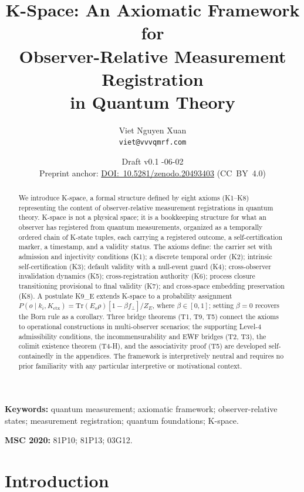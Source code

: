 \documentclass[12pt,a4paper]{article}
\title{\textbf{K-Space: An Axiomatic Framework for\\
Observer-Relative Measurement Registration\\
in Quantum Theory}}
\author{Viet Nguyen Xuan\\[6pt]
\small\texttt{viet@vvvqmrf.com}}
\date{Draft v0.1 \quad 2026-06-02\\[4pt]
\small Preprint anchor:
\href{https://doi.org/10.5281/zenodo.20493403}{DOI:~10.5281/zenodo.20493403}
\quad (CC~BY~4.0)}
\theoremstyle{plain}
\theoremstyle{definition}
\theoremstyle{remark}
\newcommand{\Kctx}{K_{\mathrm{ctx}}}
\newcommand{\fperp}{f_{\!\perp}}
\begin{document}
\maketitle
\thispagestyle{empty}

\begin{abstract}
We introduce K-space, a formal structure defined by eight axioms (K1--K8)
representing the content of observer-relative measurement registrations in
quantum theory. K-space is not a physical space; it is a bookkeeping
structure for what an observer has registered from quantum measurements,
organized as a temporally ordered chain of K-state tuples, each carrying a
registered outcome, a self-certification marker, a timestamp, and a validity
status. The axioms define: the carrier set with admission and injectivity
conditions (K1); a discrete temporal order (K2); intrinsic self-certification
(K3); default validity with a null-event guard (K4); cross-observer
invalidation dynamics (K5); cross-registration authority (K6); process closure
transitioning provisional to final validity (K7); and cross-space embedding
preservation (K8). A postulate K9\_E extends K-space to a probability
assignment $P(o\mid k_i,\Kctx) = \mathrm{Tr}(E_o\rho)[1-\beta\fperp]/Z_E$,
where $\beta\in[0,1]$; setting $\beta=0$ recovers the Born rule as a
corollary. Three bridge theorems (T1, T9, T5) connect the axioms to
operational constructions in multi-observer scenarios; the supporting
Level-4 admissibility conditions, the incommensurability and EWF bridges
(T2, T3), the colimit existence theorem (T4-H), and the associativity proof
(T5) are developed self-containedly in the appendices. The framework is
interpretively neutral and requires no prior familiarity with any
particular interpretive or motivational context.
\end{abstract}

\smallskip
\noindent\textbf{Keywords:} quantum measurement; axiomatic framework;
observer-relative states; measurement registration; quantum foundations;
K-space.

\smallskip
\noindent\textbf{MSC 2020:} 81P10; 81P13; 03G12.

\section{Introduction}
\label{sec:intro}
\end{document}
